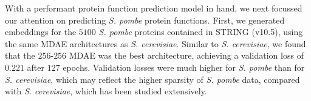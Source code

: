 %
%
%

With a performant protein function prediction model in hand, we next focussed our attention on predicting \emph{S. pombe} protein functions.
First, we generated embeddings for the $5100$ \emph{S. pombe} proteins contained in STRING (v10.5), using the same MDAE architectures as \emph{S. cerevisiae}. Similar to \emph{S. cerevisiae}, we found that the $256$-$256$ MDAE was the best architecture, achieving a validation loss of $0.221$ after $127$ epochs.
Validation losses were much higher for \emph{S. pombe} than for \emph{S. cerevisiae}, which may reflect the higher sparsity of \emph{S. pombe} data, compared with \emph{S. cerevisiae}, which has been studied extensively.

